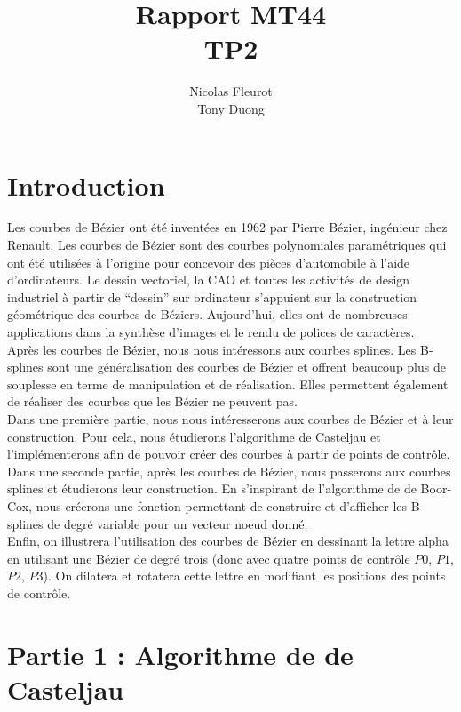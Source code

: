 \documentclass[a4paper,10pt]{report}
\title{Rapport MT44\\\huge{TP2}}
\author{Nicolas Fleurot\\Tony Duong}
\begin{document}
\maketitle

\tableofcontents

\chapter*{Introduction}

Les courbes de Bézier ont été inventées en 1962 par Pierre Bézier, ingénieur chez Renault. Les courbes de Bézier sont des courbes polynomiales paramétriques qui ont été utilisées à l’origine pour concevoir des pièces d’automobile à l’aide d’ordinateurs. Le dessin vectoriel, la CAO et toutes les activités de design industriel à partir de “dessin” sur ordinateur s’appuient sur la construction géométrique des courbes de Béziers. Aujourd’hui, elles ont de nombreuses applications dans la synthèse d’images et le rendu de polices de caractères. \\

Après les courbes de Bézier, nous nous intéressons aux courbes splines. Les B-splines sont une généralisation des courbes de Bézier et offrent beaucoup plus de souplesse en terme de manipulation et de réalisation. Elles permettent également de réaliser des courbes que les Bézier ne peuvent pas. \\

Dans une première partie, nous nous intéresserons aux courbes de Bézier et à leur construction. Pour cela, nous étudierons l’algorithme de Casteljau et l’implémenterons afin de pouvoir créer des courbes à partir de points de contrôle.\\

Dans une seconde partie, après les courbes de Bézier, nous passerons aux courbes splines et étudierons leur construction. En s’inspirant de l’algorithme de de Boor-Cox, nous créerons une fonction permettant de construire et d’afficher les B-splines de degré variable pour un vecteur noeud donné.\\

Enfin, on illustrera l’utilisation des courbes de Bézier en dessinant la lettre alpha en utilisant une Bézier de degré trois (donc avec quatre points de contrôle $P0$, $P1$, $P2$, $P3$). On dilatera et rotatera cette lettre en modifiant les positions des points de contrôle.

\chapter*{Partie 1 : Algorithme de de Casteljau}
\end{document}

